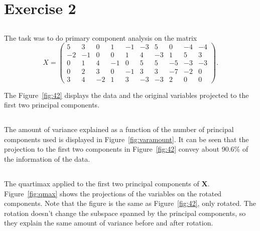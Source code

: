 \documentclass{article}
\begin{document}
\section{Exercise 2}
\newcommand{\X}{\ensuremath{\mathbf{X}}}
\subsection{}
The task was to do primary component analysis on the matrix
$$ X =
\begin{pmatrix}
	5 & 3 & 0 & 1 & -1 & -3 & 5 & 0 & -4 & -4 \\
	-2 & -1 & 0 & 0 & 1 & 4 & -3 & 1 & 5 & 3 \\
	0 & 1 & 4 & -1 & 0 & 5 & 5 & -5 & -3 & -3 \\
	0 & 2 & 3 & 0 & -1 & 3 & 3 & -7 & -2 & 0 \\
	3 & 4 & -2 & 1 & 3 & -3 & -3 & 2 & 0 & 0
\end{pmatrix}.
$$

The Figure~\ref{fig:42} displays the data and the original variables projected to the first two principal components.
\subsection{}
The amount of variance explained as a function of the number of principal components used is displayed in Figure~\ref{fig:varamount}. It can be seen that the projection to the first two components in Figure~\ref{fig:42} convey about 90.6\% of the information of the data.
\subsection{}
\subsection{}
The quartimax applied to the first two principal components of \X. Figure~\ref{fig:qmax} shows the projections of the variables on the rotated components. Note that the figure is the same as Figure~\ref{fig:42}, only rotated. The rotation doesn't change the subspace spanned by the principal components, so they explain the same amount of variance before and after rotation.
\end{document}
